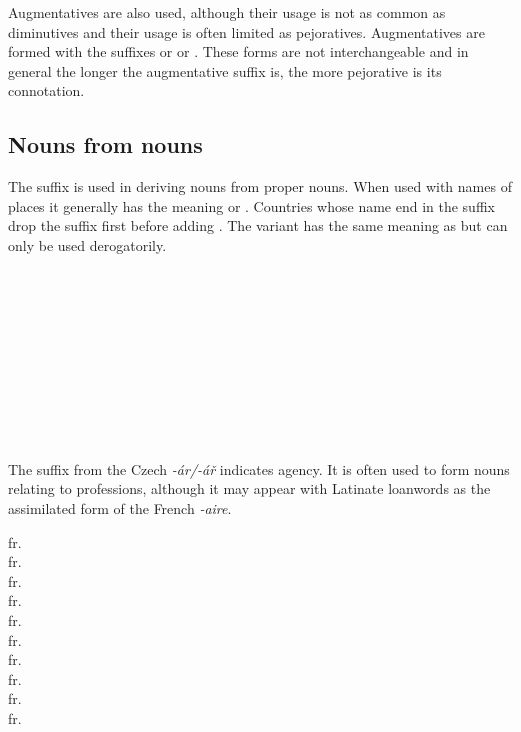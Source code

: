 Augmentatives are also used, although their usage is not as common as diminutives and their usage is often limited as pejoratives. Augmentatives are formed with the suffixes  or  or . These forms are not interchangeable and in general the longer the augmentative suffix is, the more pejorative is its connotation.

\subsection{Nouns from nouns}

The suffix  is used in deriving nouns from proper nouns. When used with names of places it generally has the meaning  or . Countries whose name end in the suffix  drop the suffix first before adding . The variant  has the same meaning as  but can only be used derogatorily.

\begin{multicols}{2}
  \ex
  \\
  \\
  \\
  \\
  \\
  \\
  \\
  \\
  \\
  \xe
\end{multicols}


The suffix  from the Czech \emph{-ár/-á\v{r}} indicates agency. It is often used to form nouns relating to professions, although it may appear with Latinate loanwords as the assimilated form of the French \emph{-aire}.

\ex
{} fr. \\
 fr. \\
 fr. \\
 fr. \\
 fr. \\
 fr. \\
 fr. \\
 fr. \\
 fr. \\
 fr. 
\xe

